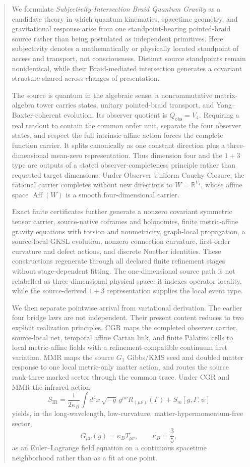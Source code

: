 \documentclass[11pt]{article}
\theoremstyle{definition}
\theoremstyle{remark}
\begin{document}
\begin{abstract}
We formulate \emph{Subjectivity-Intersection Braid Quantum Gravity} as a candidate theory in which quantum kinematics, spacetime geometry, and gravitational response arise from one standpoint-bearing pointed-braid source rather than being postulated as independent primitives. Here subjectivity denotes a mathematically or physically located standpoint of access and transport, not consciousness. Distinct source standpoints remain nonidentical, while their Braid-mediated intersection generates a covariant structure shared across changes of presentation.

The source is quantum in the algebraic sense: a noncommutative matrix-algebra tower carries states, unitary pointed-braid transport, and Yang--Baxter-coherent evolution. Its observer quotient is $Q_{\mathrm{obs}}=V_4$. Requiring a real readout to contain the common order unit, separate the four observer states, and respect the full intrinsic affine action forces the complete function carrier. It splits canonically as one constant direction plus a three-dimensional mean-zero representation. Thus dimension four and the $1+3$ type are outputs of a stated observer-completeness principle rather than requested target dimensions. Under Observer Uniform Cauchy Closure, the rational carrier completes without new directions to $W=\mathbb R^{V_4}$, whose affine space $\operatorname{Aff}(W)$ is a smooth four-dimensional carrier.

Exact finite certificates further generate a nonzero covariant symmetric tensor carrier, source-native coframes and holonomies, finite metric-affine gravity equations with torsion and nonmetricity, graph-local propagation, a source-local GKSL evolution, nonzero connection curvature, first-order curvature and defect actions, and discrete Noether identities. These constructions regenerate through all declared finite refinement stages without stage-dependent fitting. The one-dimensional source path is not relabelled as three-dimensional physical space: it indexes operator locality, while the source-derived $1+3$ representation supplies the local event type.

We then separate pointwise arrival from variational derivation. The earlier four bridge laws are not independent. Their present content reduces to two explicit realization principles. CGR maps the completed observer carrier, source-local net, temporal affine Cartan link, and finite Palatini cells to local metric-affine fields with a refinement-compatible continuum first variation. MMR maps the source $G_1$ Gibbs/KMS seed and doubled matter response to one local metric-only matter action, and routes the source rank-three marked sector through the common trace. Under CGR and MMR the infrared action
\[
S_{\mathrm{IR}}=\frac{1}{2\kappa_B}\int d^4x\,\sqrt{-g}\,
g^{\mu\nu}R_{(\mu\nu)}(\Gamma)+S_m[g,\Gamma,\psi]
\]
yields, in the long-wavelength, low-curvature, matter-hypermomentum-free sector,
\[
G_{\mu\nu}(g)=\kappa_B T_{\mu\nu},\qquad \kappa_B=\frac35,
\]
as an Euler--Lagrange field equation on a continuous spacetime neighborhood rather than as a fit at one point.


\end{abstract}
\end{document}
